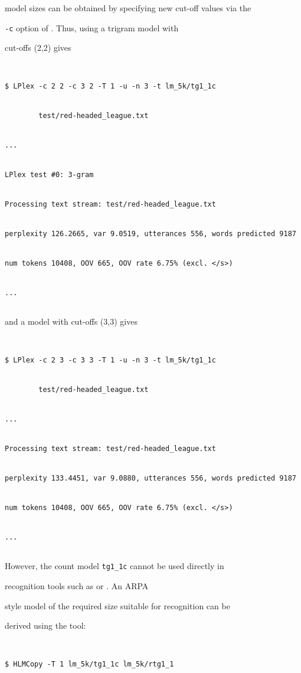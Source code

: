 model sizes can be obtained by specifying new cut-off values via the


\texttt{-c} option of .  Thus, using a trigram model with 


cut-offs (2,2) gives


\begin{verbatim}


$ LPlex -c 2 2 -c 3 2 -T 1 -u -n 3 -t lm_5k/tg1_1c 


        test/red-headed_league.txt


...


LPlex test #0: 3-gram 


Processing text stream: test/red-headed_league.txt


perplexity 126.2665, var 9.0519, utterances 556, words predicted 9187


num tokens 10408, OOV 665, OOV rate 6.75% (excl. </s>)


...


\end{verbatim} %


and a model with cut-offs (3,3) gives


\begin{verbatim}


$ LPlex -c 2 3 -c 3 3 -T 1 -u -n 3 -t lm_5k/tg1_1c 


        test/red-headed_league.txt


...


Processing text stream: test/red-headed_league.txt


perplexity 133.4451, var 9.0880, utterances 556, words predicted 9187


num tokens 10408, OOV 665, OOV rate 6.75% (excl. </s>)


...


\end{verbatim} %





However, the count model \texttt{tg1\_1c} cannot be used directly in


recognition tools such as  or .  An ARPA


style model of the required size suitable for recognition can be


derived using the  tool:


\begin{verbatim}


$ HLMCopy -T 1 lm_5k/tg1_1c lm_5k/rtg1_1


\end{verbatim} %


